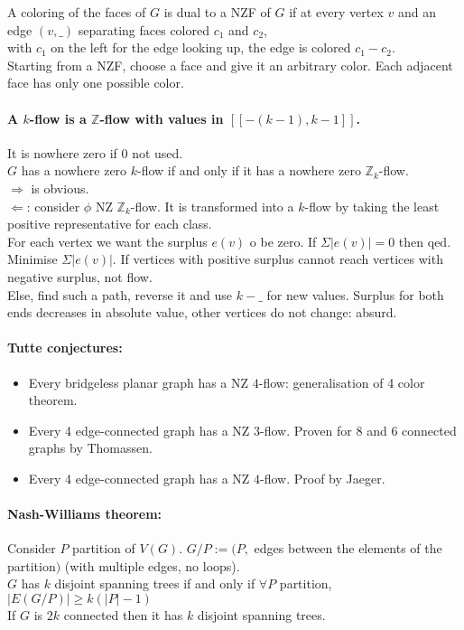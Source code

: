 \documentclass[12pt]{article}
\begin{document}
A coloring of the faces of $G$ is dual to a NZF of $G$ if at every vertex $v$ and an edge $(v,\_)$ separating faces colored $c_1$ and $c_2$,\\
with $c_1$ on the left for the edge looking up, the edge is colored $c_1 - c_2$.\\
Starting from a NZF, choose a face and give it an arbitrary color. Each adjacent face has only one possible color.\\

\paragraph{A $k$-flow is a $\mathbb{Z}$-flow with values in $[[-(k-1), k-1]]$.} It is nowhere zero if 0 not used.\\
$G$ has a nowhere zero $k$-flow if and only if it has a nowhere zero $\mathbb{Z}_k$-flow.\\
$\Rightarrow$ is obvious.\\
$\Leftarrow$: consider $\phi$ NZ  $\mathbb{Z}_k$-flow. It is transformed into a $k$-flow by taking the least positive representative for each class.\\
For each vertex we want the surplus $e(v)$ o be zero. If $\Sigma |e(v)| = 0$ then qed.\\
Minimise $\Sigma |e(v)|$. If vertices with positive surplus cannot reach vertices with negative surplus, not flow.\\
Else, find such a path, reverse it and use $k-\_$ for new values. Surplus for both ends decreases in absolute value, other vertices do not change: absurd.\\

\paragraph{Tutte conjectures:}
\begin{itemize}
\item Every bridgeless planar graph has a NZ $4$-flow: generalisation of 4 color theorem.
\item Every 4 edge-connected graph has a NZ $3$-flow. Proven for $8$ and $6$ connected graphs by Thomassen.
\item Every 4 edge-connected graph has a NZ $4$-flow. Proof by Jaeger.
\end{itemize}

\paragraph{Nash-Williams theorem:\\} %
Consider $P$ partition of $V(G)$. $G/P := (P,$ edges between the elements of the partition$)$ (with multiple edges, no loops).\\
$G$ has $k$ disjoint spanning trees if and only if $\forall P$ partition, $|E(G/P)| \geqslant k(|P|-1)$\\
If $G$ is $2k$ connected then it has $k$ disjoint spanning trees.\\
\end{document}
